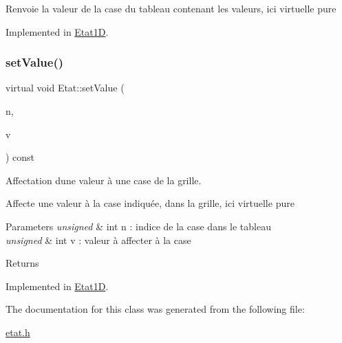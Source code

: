 Renvoie la valeur de la case du tableau contenant les valeurs, ici virtuelle pure 

Implemented in \mbox{\hyperlink{class_etat1_d_ace95184883c3979e8778959966698dd4}{Etat1D}}.

\mbox{\label{class_etat_a92ad894e65a419e1cddb335664deea3e}} 
\subsubsection{\texorpdfstring{set\+Value()}{setValue()}}
{\footnotesize\ttfamily virtual void Etat\+::set\+Value (\begin{DoxyParamCaption}\item[{unsigned int}]{n,  }\item[{unsigned int}]{v }\end{DoxyParamCaption}) const\hspace{0.3cm}{\ttfamily [pure virtual]}}



Affectation d\textquotesingle{}une valeur à une case de la grille. 

Affecte une valeur à la case indiquée, dans la grille, ici virtuelle pure


\begin{DoxyParams}{Parameters}
{\em unsigned} & int n \+: indice de la case dans le tableau \\
\hline
{\em unsigned} & int v \+: valeur à affecter à la case \\
\hline
\end{DoxyParams}
\begin{DoxyReturn}{Returns}

\end{DoxyReturn}


Implemented in \mbox{\hyperlink{class_etat1_d_ac832c95a19cb5f21b76ca7595be2904a}{Etat1D}}.



The documentation for this class was generated from the following file\+:\begin{DoxyCompactItemize}
\item 
\mbox{\hyperlink{etat_8h}{etat.\+h}}\end{DoxyCompactItemize}
